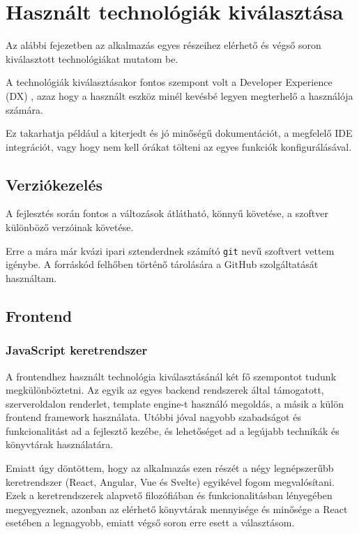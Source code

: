 \chapter{Használt technológiák kiválasztása}

Az alábbi fejezetben az alkalmazás egyes részeihez elérhető és végső soron kiválasztott technológiákat mutatom be.

A technológiák kiválasztásakor fontos szempont volt a Developer Experience (DX) \cite{DX}, azaz hogy a használt eszköz minél kevésbé legyen megterhelő a használója számára.

Ez takarhatja például a kiterjedt és jó minőségű dokumentációt, a megfelelő IDE integrációt, vagy hogy nem kell órákat tölteni az egyes funkciók konfigurálásával.

\section{Verziókezelés}

A fejlesztés során fontos a változások átlátható, könnyű követése, a szoftver különböző verzóinak követése.

Erre a mára már kvázi ipari sztenderdnek számító \lstinline|git| nevű szoftvert vettem igénybe. A forráskód felhőben
történő tárolására a GitHub szolgáltatását használtam.

\section{Frontend}
\subsection{JavaScript keretrendszer}
A frontendhez használt technológia kiválasztásánál két fő szempontot tudunk megkülönböztetni.
Az egyik az egyes backend rendszerek által támogatott, szerveroldalon renderlet, template engine-t használó megoldás, a másik a külön frontend framework használata.
Utóbbi jóval nagyobb szabadságot és funkcionalitást ad a fejlesztő kezébe, és lehetőséget ad a legújabb technikák és könyvtárak használatára.

Emiatt úgy döntöttem, hogy az alkalmazás ezen részét a négy legnépszerűbb keretrendszer (React, Angular, Vue és Svelte) egyikével fogom megvalósítani.
Ezek a keretrendszerek alapvető filozófiában és funkcionalitásban lényegében megyegyeznek, azonban az elérhető könyvtárak mennyisége és minősége a React esetében a legnagyobb, emiatt végső soron erre esett a választásom. \cite{React}

